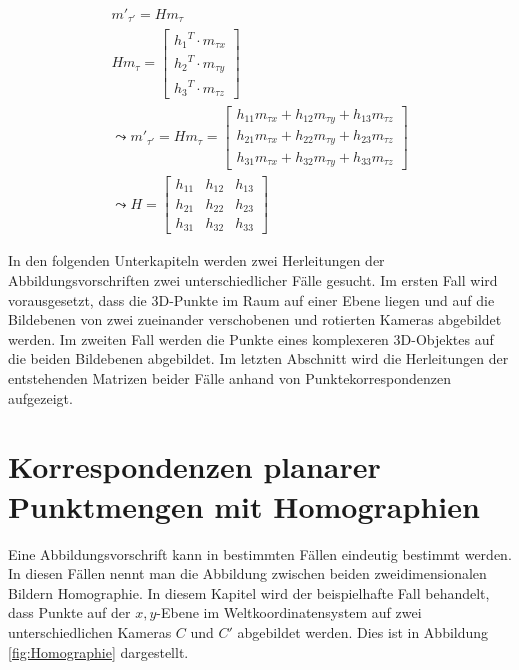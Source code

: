 \begin{gather}
	m'_{\tau'} = Hm_{\tau}\\
	Hm_{\tau} = \begin{bmatrix}
		{h_1}^T \cdot m_{\tau x}\\{h_2}^T \cdot m_{\tau y}\\{h_3}^T \cdot m_{\tau z}
	\end{bmatrix} \\
	\leadsto 
	m'_{\tau'}= Hm_{\tau}= \begin{bmatrix}
		h_{11}m_{\tau x}+h_{12}m_{\tau y}+h_{13}m_{\tau z}\\
		h_{21}m_{\tau x}+h_{22}m_{\tau y}+h_{23}m_{\tau z}\\
		h_{31}m_{\tau x}+h_{32}m_{\tau y}+h_{33}m_{\tau z}
	\end{bmatrix}\\
	\leadsto 
	H=\begin{bmatrix}
		h_{11}&h_{12}&h_{13}\\
		h_{21}&h_{22}&h_{23}\\
		h_{31}&h_{32}&h_{33}
	\end{bmatrix}
\end{gather}


In den folgenden Unterkapiteln werden zwei Herleitungen der Abbildungsvorschriften zwei unterschiedlicher Fälle gesucht. Im ersten Fall wird vorausgesetzt, dass die 3D-Punkte im Raum auf einer Ebene liegen und auf die Bildebenen von zwei zueinander verschobenen und rotierten Kameras abgebildet werden. Im zweiten Fall werden die Punkte eines komplexeren 3D-Objektes auf die beiden Bildebenen abgebildet. Im letzten Abschnitt wird die Herleitungen der entstehenden Matrizen beider Fälle anhand von Punktekorrespondenzen aufgezeigt. 


\section{Korrespondenzen planarer Punktmengen mit Homographien}

Eine Abbildungsvorschrift kann in bestimmten Fällen eindeutig bestimmt werden. In diesen Fällen nennt man die Abbildung zwischen beiden zweidimensionalen Bildern Homographie\cite{HZ,Elements,Roser}. In diesem Kapitel wird der beispielhafte Fall behandelt, dass Punkte auf der $x,y$-Ebene im Weltkoordinatensystem auf zwei unterschiedlichen Kameras $C$ und $C'$ abgebildet werden. Dies ist in Abbildung \ref{fig:Homographie} dargestellt.
\pagebreak


